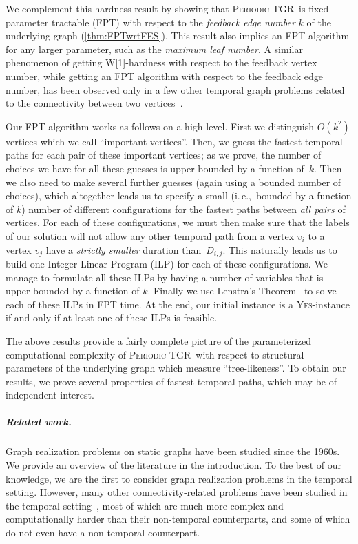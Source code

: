 \documentclass[a4paper,UKenglish,cleveref, autoref, thm-restate, anonymous]{lipics-v2021}
\newcommand{\ie}{i.\,e.,\ }
\newcommand{\deltaExact}{\textsc{Periodic TGR}}
\begin{document}
We complement this hardness result by showing that \deltaExact\ is fixed-parameter tractable (FPT) with respect to the \emph{feedback edge number} $k$ of the underlying graph (\cref{thm:FPTwrtFES}). 
This result also implies an FPT algorithm for any larger parameter, such as the \emph{maximum leaf number}. 
A similar phenomenon of getting W[1]-hardness with respect to the feedback vertex number, while getting an FPT algorithm with respect to the feedback edge number, has been observed only in a few other temporal graph problems related to the connectivity between two vertices~\cite{casteigts2021finding,FMNR22a,EMM22}.

Our FPT algorithm works as follows on a high level. 
First we distinguish $O(k^2)$ vertices which we call ``important vertices''. 
Then, we guess the fastest temporal paths for each pair of these important vertices; as we prove, the number of choices we have for all these guesses is upper bounded by a function of~$k$. 
Then we also need to make several further guesses (again using a bounded number of choices), which altogether leads us to specify a small (\ie bounded by a function of $k$) number of different configurations for the fastest paths between \emph{all pairs} of vertices. For each of these configurations, we must then make sure that the labels of our solution will not allow any other temporal path from a vertex $v_i$ to a vertex $v_j$ have a \emph{strictly smaller} duration than~$D_{i,j}$.
This naturally leads us to build one Integer Linear Program (ILP) for each of these configurations. We manage to formulate all these ILPs by having a number of variables that is upper-bounded by a function of $k$. Finally we use Lenstra's Theorem~\cite{Lenstra1983Integer} to solve each of these ILPs in FPT time. At the end, our initial instance is a \textsc{Yes}-instance if and only if at least one of these ILPs is feasible.



The above results provide a fairly complete picture of the parameterized computational complexity of \deltaExact\ with respect to structural parameters of the underlying graph which measure ``tree-likeness''. To obtain our results, we prove several properties of fastest temporal paths, which may be of independent interest.


\subparagraph{Related work.} Graph realization problems on static graphs have been studied since the 1960s. We provide an overview of the literature in the introduction. 
To the best of our knowledge, we are the first to consider graph realization problems in the temporal setting. However, many other connectivity-related problems have been studied in the temporal setting~\cite{Mertzios-transitivity21,Akrida-explorer-21,enright2021deleting,MolterRZ21,klobas2023interference,deligkas2022optimizing,erlebach2021temporal,Flu+19a,Zsc+19,CasteigtsCS22,FuchsleMNR22}, most of which are much more complex and computationally harder than their non-temporal counterparts, and some of which do not even have a non-temporal counterpart.
\end{document}
